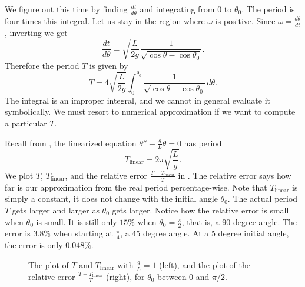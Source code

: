 We figure out this time by finding
$\frac{dt}{d\theta}$ and integrating from $0$ to $\theta_0$.
The period is four times
this integral.  Let us stay in the region where $\omega$ is positive.
Since $\omega = \frac{d\theta}{dt}$, inverting we get
\begin{equation*}
\frac{dt}{d\theta} = \sqrt{\frac{L}{2g}} \frac{1}{\sqrt{\cos \theta - \cos \theta_0 }} .
\end{equation*}
Therefore the period $T$ is given by
\begin{equation*}
T = 4 \sqrt{\frac{L}{2g}} \int_0^{\theta_0} \frac{1}{\sqrt{\cos \theta -
\cos \theta_0 }}\, d\theta .
\end{equation*}
The integral is an improper integral, and we cannot in
general evaluate it symbolically.  We must resort to numerical
approximation if we want to compute a particular $T$.

Recall from , the linearized equation $\theta''+\frac{g}{L}\theta
= 0$ has period
\begin{equation*}
T_{\text{linear}} = 2\pi \sqrt{\frac{L}{g}} .
\end{equation*}
We plot $T$, $T_{\text{linear}}$, and the relative error
$\frac{T-T_{\text{linear}}}{T}$ in .  The relative error
says how far is our approximation from the real period percentage-wise.
Note that $T_{\text{linear}}$ is simply a constant, it does not change with
the initial angle $\theta_0$.  The actual period $T$ gets larger and larger as
$\theta_0$ gets larger.
Notice how the relative error is small when $\theta_0$ is small.  It is
still only $15\%$ when $\theta_0 = \frac{\pi}{2}$, that is, a 90 degree
angle.  The error is $3.8\%$ when starting at $\frac{\pi}{4}$, 
a 45 degree angle.  At a 5 degree initial angle, the error is only $0.048 \%$.

\begin{figure}[h!t]
\capstart
\begin{center}
\caption{The plot of $T$ and $T_{\text{linear}}$ with $\frac{g}{L} =
1$ (left), and the plot of the relative
error $\frac{T-T_{\text{linear}}}{T}$ (right), for $\theta_0$ between 0 and $\pi/2$. \label{fig:TvsT0}}
\end{center}
\end{figure}

